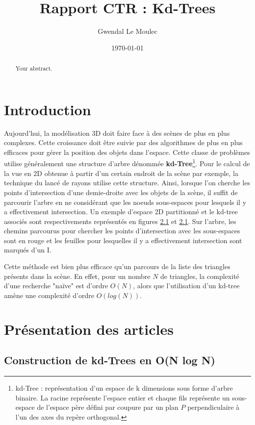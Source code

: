 \documentclass[a4paper]{article}
\title{Rapport CTR : Kd-Trees}
\author{Gwendal Le Moulec}
\date{\today}
\begin{document}
\maketitle

\begin{abstract}
Your abstract.
\end{abstract}

\section{Introduction}

Aujourd'hui, la modélisation 3D doit faire face à des scènes de plus en plus complexes. Cette croissance doit être suivie par des algorithmes de plus en plus efficaces pour gérer la position des objets dans l'espace. Cette classe de problèmes utilise généralement une structure d'arbre dénommée \textbf{kd-Tree}\footnote{kd-Tree : représentation d'un espace de k dimensions sous forme d'arbre binaire. La racine représente l'espace entier et chaque fils représente un sous-espace de l'espace père défini par coupure par un plan $P$ perpendiculaire à l'un des axes du repère orthogonal.}. Pour le calcul de la vue en 2D obtenue à partir d'un certain endroit de la scène par exemple, la technique du lancé de rayons utilise cette structure. Ainsi, lorsque l'on cherche les points d'intersection d'une demie-droite avec les objets de la scène, il suffit de parcourir l'arbre en ne considérant que les noeuds sous-espaces pour lesquels il y a effectivement intersection. Un exemple d'espace 2D partitionné et le kd-tree associés sont respectivements représentés en figures \ref{} et \ref{}. Sur l'arbre, les chemins parcourus pour chercher les points d'intersection avec les sous-espaces sont en rouge et les feuilles pour lesquelles il y a effectivement intersection sont marqués d'un I.


Cette méthode est bien plus efficace qu'un parcours de la liste des triangles présents dans la scène. En effet, pour un nombre $N$ de triangles, la complexité d'une recherche "naïve" est d'ordre $O(N)$, alors que l'utilisation d'un kd-tree amène une complexité d'ordre $O(log(N))$.

\section{Présentation des articles}

\subsection{Construction de kd-Trees en O(N log N)}
\end{document}

